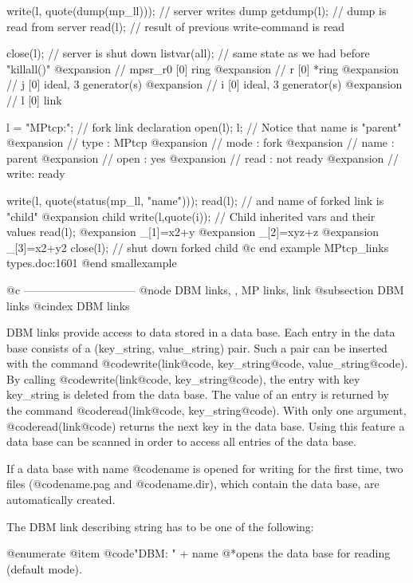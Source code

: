 {{{{{{  write(l, quote(dump(mp_ll)));    // server writes dump
  getdump(l);        // dump is read from server
  read(l);           // result of previous write-command is read

  close(l);          // server is shut down
  listvar(all);      // same state as we had before "killall()"
@expansion{} // mpsr_r0              [0]  ring
@expansion{} // r                    [0]  *ring
@expansion{} //      j                    [0]  ideal, 3 generator(s)
@expansion{} //      i                    [0]  ideal, 3 generator(s)
@expansion{} // l                    [0]  link

  l = "MPtcp:";      // fork link declaration
  open(l); l;        // Notice that name is "parent"
@expansion{} // type : MPtcp
@expansion{} // mode : fork
@expansion{} // name : parent
@expansion{} // open : yes
@expansion{} // read : not ready
@expansion{} // write: ready

  write(l, quote(status(mp_ll, "name")));
  read(l);           // and name of forked link is "child"
@expansion{} child
  write(l,quote(i)); // Child inherited vars and their values
  read(l);
@expansion{} _[1]=x2+y
@expansion{} _[2]=xyz+z
@expansion{} _[3]=x2+y2
  close(l);          // shut down forked child
@c end example MPtcp_links types.doc:1601
@end smallexample

@c ------------------------------
@node DBM links,  , MP links, link
@subsection DBM links
@cindex DBM links

DBM links provide access to data stored in a data base.
Each entry in the data base consists of a (key_string,
value_string) pair. Such a pair can be inserted with the command
@code{write(}link@code{,} key_string@code{,} value_string@code{)}.  By
calling @code{write(}link@code{,} key_string@code{)}, the entry with key
key_string is deleted from the data base. The value of an entry is
returned by the command @code{read(}link@code{,}
key_string@code{)}. With only one argument, @code{read(}link@code{)}
returns the next key in the data base. Using this feature a
data base can be scanned in order to access all entries of the data base.

If a data base with name @code{name} is opened for writing for the first
time, two files (@code{name.pag} and @code{name.dir}), which contain the
data base, are automatically created.

The DBM link describing string has to be one of the following:

@enumerate
@item @code{"DBM: "} + name
@*opens the data base for reading (default mode).

}}}}}}
